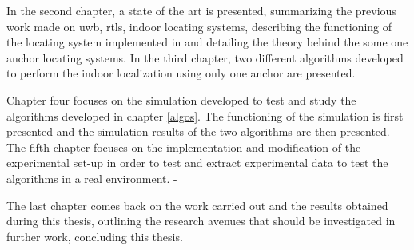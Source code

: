 In the second chapter, a state of the art is presented, summarizing the previous work made on \gls{uwb}, \gls{rtls}, indoor locating systems, describing the functioning of the locating system implemented in \cite{hannotier2019indoor} and detailing the theory behind the some one anchor  locating systems. In the third chapter, two different algorithms developed to perform the indoor localization using only one anchor are presented.
\vspace{2mm}

Chapter four focuses on the simulation developed to test and study the algorithms developed in chapter \ref{algos}. The functioning of the simulation is first presented and the simulation results of the two algorithms are then presented. The fifth chapter focuses on the implementation and modification of the experimental set-up in order to test and extract experimental data to test the algorithms in a real environment. -
\vspace{2mm}

The last chapter comes back on the work carried out and the results obtained during this thesis, outlining the research avenues that should be investigated in further work, concluding this thesis.
